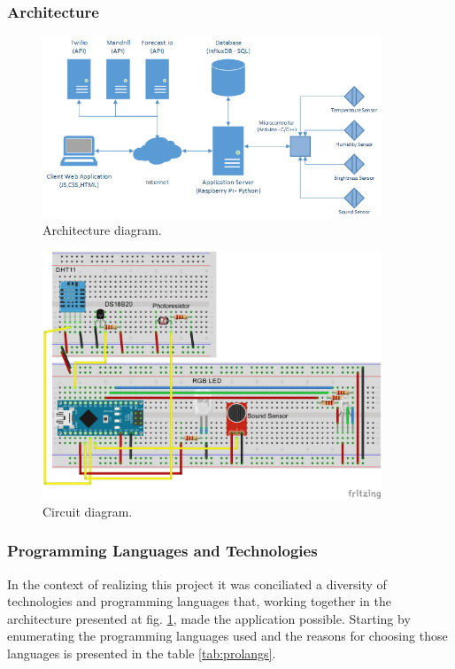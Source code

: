\documentclass[12pt]{article}
\begin{document}
\subsubsection{Architecture}

\begin{figure}[H]
    \centering
    \includegraphics[width=0.9\textwidth]{arc.png}
    \caption{Architecture diagram.}
    \label{fig:arc}
\end{figure}

\begin{figure}[H]
    \centering
    \includegraphics[width=0.9\textwidth]{schematics.png}
    \caption{Circuit diagram.}
    \label{fig:circ}
\end{figure}


\subsubsection{Programming Languages and Technologies}

In the context of realizing this project it was conciliated a diversity of technologies and programming languages that, working together in the architecture presented at fig. \ref{fig:arc}, made the application possible. Starting by enumerating the programming languages used and the reasons for choosing those languages is presented in the table \ref{tab:prolangs}.
\end{document}
